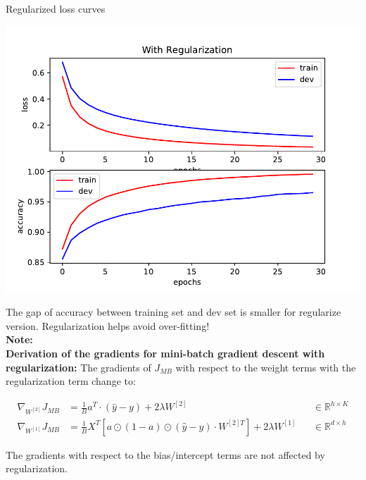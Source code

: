 \begin{answer}
Regularized loss curves

\includegraphics[scale=0.75]{../src/mnist/regularized}

The gap of accuracy between training set and dev set is smaller for regularize version.
Regularization helps avoid over-fitting!\\

\textbf{Note: \\ Derivation of the gradients for mini-batch gradient descent with regularization:}
The gradients of $J_{MB}$ with respect to the weight terms with the regularization term change to:

\begin{align*}
\nabla_{W^{[2]}} J_{MB} &=
\frac{1}{B} a^T  \cdot \left( \hat{y} - y \right) + 2 \lambda W^{[2]} & &\in \mathbb{R}^{h \times K}\\
\nabla_{W^{[1]}} J_{MB} &=
\frac{1}{B} X^T \left[ a \odot (1-a) \odot
\left( \hat{y} - y \right) \cdot W^{[2]T} \right]  + 2 \lambda W^{[1]} & &\in \mathbb{R}^{d \times h}
\end{align*}

The gradients with respect to the bias/intercept terms are not affected by regularization.
  
\end{answer}
   
  
